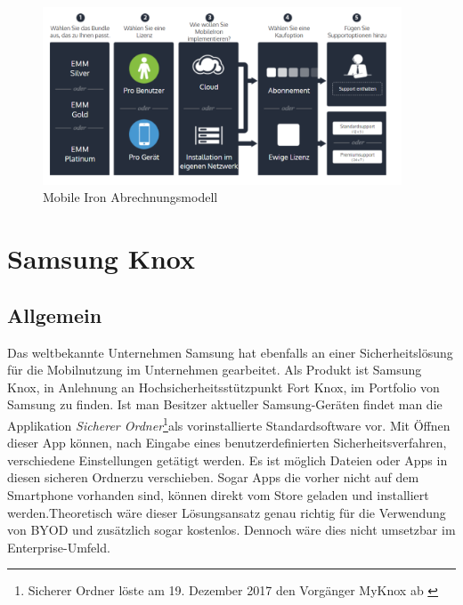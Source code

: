 \begin{figure}[hbt]
\centering
\includegraphics[width=0.95\textwidth]{Bilder/mi_2.png} 
\caption{Mobile Iron Abrechnungsmodell}\label{fig:MobIro2}
\end{figure}

\newpage

\section{Samsung Knox}

\subsection{Allgemein}\label{sub:Allgemein}
Das weltbekannte Unternehmen Samsung hat ebenfalls an einer Sicherheitslösung für die Mobilnutzung im Unternehmen gearbeitet. Als Produkt ist Samsung Knox, in Anlehnung an Hochsicherheitsstützpunkt Fort Knox, im Portfolio von Samsung zu finden.
Ist man Besitzer aktueller Samsung-Geräten findet man die Applikation \textit{Sicherer Ordner}\footnote{Sicherer Ordner löste am 19. Dezember 2017 den Vorgänger MyKnox ab \cite{sam2017b} }als vorinstallierte Standardsoftware vor. Mit Öffnen dieser App können, nach Eingabe eines benutzerdefinierten Sicherheitsverfahren, verschiedene Einstellungen getätigt werden. Es ist möglich Dateien oder Apps in diesen \flqq sicheren Ordner\frqq  zu verschieben. Sogar Apps die vorher nicht auf dem Smartphone vorhanden sind, können direkt vom Store geladen und installiert werden.Theoretisch wäre dieser Lösungsansatz genau richtig für die Verwendung von BYOD und zusätzlich sogar kostenlos. Dennoch wäre dies nicht umsetzbar im Enterprise-Umfeld.

